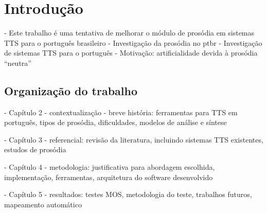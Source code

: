 
\chapter{Introdução}
- Este trabalho é uma tentativa de melhorar o módulo de prosódia em sistemas TTS
para o português brasileiro
- Investigação da prosódia no ptbr
- Investigação de sistemas TTS para o português
- Motivação: artificialidade devida à prosódia ``neutra''


\section{Organização do trabalho}

- Capítulo 2 - contextualização - breve história:
ferramentas para TTS em português, tipos de prosódia, dificuldades, modelos de
análise e síntese

- Capítulo 3 - referencial:
revisão da literatura, incluindo sistemas TTS existentes, estudos de prosódia

- Capítulo 4 - metodologia:
justificativa para abordagem escolhida, implementação, ferramentas, arquitetura
do software desenvolvido

- Capítulo 5 - resultados:
testes MOS, metodologia do teste, trabalhos futuros, mapeamento automático

